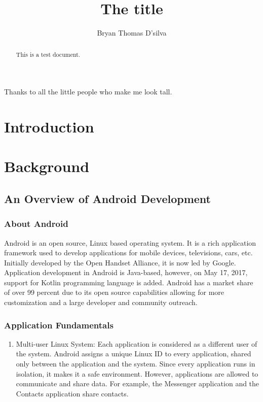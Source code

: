 \documentclass[12pt]{dalcsthesis}
\begin{document}
\macs  %
\title{The title}
\author{Bryan Thomas D'silva}



\nolistoftables
\nolistoffigures

\frontmatter

\begin{abstract}
This is a test document.
\end{abstract}

\begin{acknowledgements}
Thanks to all the little people who make me look tall.
\end{acknowledgements}

\mainmatter

\chapter{Introduction}
\chapter{Background}
\section{An Overview of Android Development}
\subsection{About Android}
Android is an open source, Linux based operating system. It is a rich application framework used to develop applications for mobile devices, televisions, cars, etc. Initially developed by the Open Handset Alliance, it is now led by Google. Application development in Android is Java-based, however, on May 17, 2017, support for Kotlin programming language is added. Android has a market share of over 99 percent due to its open source capabilities allowing for more customization and a large developer and community outreach.
\subsection{Application Fundamentals}
\begin{enumerate}
\item Multi-user Linux System: \newline
Each application is considered as a different user of the system. Android assigns a unique Linux ID to every application, shared only between the application and the system. Since every application runs in isolation, it makes it a safe environment. However, applications are allowed to communicate and share data. For example, the Messenger application and the Contacts application share contacts.
\end{enumerate}
\end{document}

